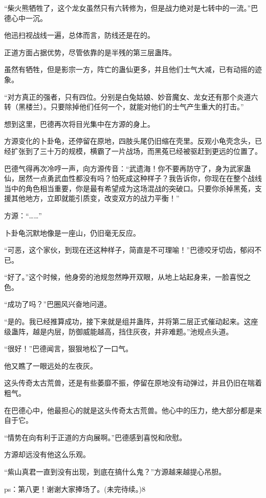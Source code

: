 \begin{this_body}
“柴火熊牺牲了，这个龙女虽然只有六转修为，但是战力绝对是七转中的一流。”巴德心中一沉。

他迅扫视战线一遍，总体而言，防线还是在的。

正道方面占据优势，尽管依靠的是半残的第三层蛊阵。

虽然有牺牲，但是影宗一方，阵亡的蛊仙更多，并且他们士气大减，已有动摇的迹象。

“对方真正的强者，只有四位。分别是白兔姑娘、妙音魔女、龙女还有那个炎道六转（黑楼兰）。只要除掉他们任何一个，就能对他们的士气产生重大的打击。”

想到这里，巴德再次将目光集中在方源的身上。

方源变化的卜卦龟，还停留在原地，四肢头尾仍旧缩在壳里。反观小龟壳念头，已经扩张到了三十万的规模，横霸了一片战场，而黑菟已经被驱赶到更远的位置了。

巴德气得再次冷哼一声，向方源传音：“武遗海！你不要再防守了，身为武家蛊仙，居然一点勇武血性都没有吗？怕死成这种样子？我告诉你，你现在在整个战线当中的角色相当重要，你是最有希望成为这场混战的突破口。只要你杀掉黑菟，支援其他地方，立即就能引质变，改变双方的战力平衡！”

方源：“……”

卜卦龟沉默地像是一座山，仍旧毫无反应。

“可恶，这个家伙，到现在还这种样子，简直是不可理喻！”巴德咬牙切齿，郁闷不已。

“好了。”这个时候，他身旁的池规忽然睁开双眼，从地上站起身来，一脸喜悦之色。

“成功了吗？”巴圈风兴奋地问道。

“是的。我已经推算成功，接下来就是组并蛊阵，并将第二层正式催动起来。这座级蛊阵，越是内层，防御威能越高，挡住灰夜，并非难题。”池规点头道。

“很好！”巴德闻言，狠狠地松了一口气。

他又瞧了一眼远处的左夜灰。

这头传奇太古荒兽，还是有些萎靡不振，停留在原地没有动弹过，并且仍旧在喘着粗气。

在巴德心中，他最担心的就是这头传奇太古荒兽。他心中的压力，绝大部分都是来自于它。

“情势在向有利于正道的方向展啊。”巴德感到喜悦和欣慰。

方源却远没有他这么乐观。

“紫山真君一直到没有出现，到底在搞什么鬼？”方源越来越提心吊胆。

ps：第八更！谢谢大家捧场了。(未完待续。)8

\end{this_body}

